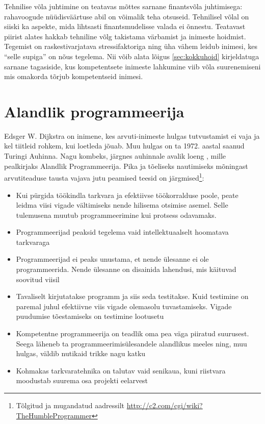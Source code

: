 \documentclass{tufte-book}
\begin{document}
Tehnilise võla juhtimine on teatavas mõttes sarnane finantsvõla juhtimisega: rahavoogude nüüdisväärtuse abil on võimalik teha otsuseid. Tehnilisel võlal on siiski ka aspekte, mida lihtsasti finantsmudelisse valada ei õnnestu. Teatavast piirist alates hakkab tehniline võlg takistama värbamist ja inimeste hoidmist. Tegemist on raskestivarjatava stressifaktoriga ning üha vähem leidub inimesi, kes \enquote{selle supiga} on nõus tegelema. Nii võib alata lõigus \ref{sec:kokkuhoid} kirjeldatuga sarnane tagasiside, kus kompetentsete inimeste lahkumine viib võla suurenemiseni mis omakorda tõrjub kompetentseid inimesi. 

\section{Alandlik programmeerija}
\label{humble}
Edsger W. Dijkstra on inimene, kes arvuti-inimeste hulgas tutvustamist ei vaja ja kel tiitleid rohkem, kui loetleda jõuab. Muu hulgas on ta 1972. aastal saanud Turingi Auhinna. Nagu kombeks, järgnes auhinnale avalik loeng \citep{yourdon1979classics}, mille pealkirjaks Alandlik Programmeerija. Pika ja tõeliseks nautimiseks mõningast arvutiteaduse tausta vajava jutu peamised teesid on järgmised\footnote{Tõlgitud ja mugandatud aadressilt \url{http://c2.com/cgi/wiki?TheHumbleProgrammer}}:
\begin{itemize}
	\item Kui pürgida töökindla tarkvara ja efektiivse töökorralduse poole, peate leidma viisi vigade vältimiseks nende hilisema otsimise asemel. Selle tulemusena muutub programmeerimine kui protsess odavamaks.
	\item Programmeerijad peaksid tegelema vaid intellektuaalselt hoomatava tarkvaraga
	\item Programmeerijad ei peaks unustama, et nende ülesanne ei ole programmeerida. Nende ülesanne on disainida lahendusi, mis käituvad soovitud viisil
	\item Tavaliselt kirjutatakse programm ja siis seda testitakse. Kuid testimine on paremal juhul efektiivne viis vigade olemasolu tuvastamiseks. Vigade puudumise  tõestamiseks on testimine lootusetu
	\item Kompetentne programmeerija on teadlik oma pea väga piiratud suurusest. Seega läheneb ta programmeerimisülesandele alandlikus meeles ning, muu hulgas, väldib nutikaid trikke nagu katku
	\item Kohmakas tarkvaratehnika on talutav vaid senikaua, kuni riistvara moodustab suurema osa projekti eelarvest
\end{itemize}
\end{document}
